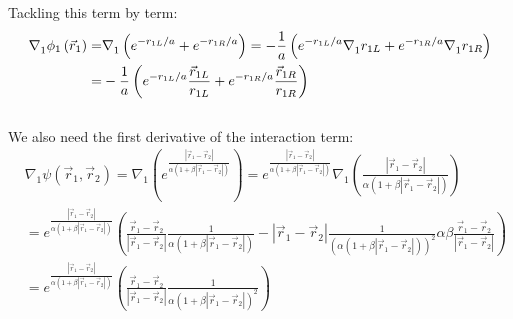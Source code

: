  Tackling this term by term: 
 \begin{align}
 \nabla _1^{}{\phi _1}\left( {{{\vec r}_1}} \right) =& \nabla _1^{}\left( {{e^{ - {{{r_{1L}}} \mathord{\left/
  {\vphantom {{{r_{1L}}} a}} \right.
  \kern-\nulldelimiterspace} a}}} + {e^{ - {{{r_{1R}}} \mathord{\left/
  {\vphantom {{{r_{1R}}} a}} \right.
  \kern-\nulldelimiterspace} a}}}} \right) =  - \frac{1}{a}\left( {{e^{ - {{{r_{1L}}} \mathord{\left/
  {\vphantom {{{r_{1L}}} a}} \right.
  \kern-\nulldelimiterspace} a}}}\nabla _1^{}{r_{1L}} + {e^{ - {{{r_{1R}}} \mathord{\left/
  {\vphantom {{{r_{1R}}} a}} \right.
  \kern-\nulldelimiterspace} a}}}\nabla _1^{}{r_{1R}}} \right)\nonumber\\ =&  - \frac{1}{a}\left( {{e^{ - {{{r_{1L}}} \mathord{\left/
  {\vphantom {{{r_{1L}}} a}} \right.
  \kern-\nulldelimiterspace} a}}}\frac{{{{\vec r}_{1L}}}}{{{r_{1L}}}} + {e^{ - {{{r_{1R}}} \mathord{\left/
  {\vphantom {{{r_{1R}}} a}} \right.
  \kern-\nulldelimiterspace} a}}}\frac{{{{\vec r}_{1R}}}}{{{r_{1R}}}}} \right)
 \end{align}\\
 We also need the first derivative of the interaction term:
 \begin{align}
 &\nabla _1^{}\psi \left( {{{\vec r}_1},{{\vec r}_2}} \right) = \nabla _1^{}\left( {{e^{\frac{{\left| {{{\vec r}_1} - {{\vec r}_2}} \right|}}{{\alpha \left( {1 + \beta \left| {{{\vec r}_1} - {{\vec r}_2}} \right|} \right)}}}}} \right) = {e^{\frac{{\left| {{{\vec r}_1} - {{\vec r}_2}} \right|}}{{\alpha \left( {1 + \beta \left| {{{\vec r}_1} - {{\vec r}_2}} \right|} \right)}}}}\nabla _1^{}\left( {\frac{{\left| {{{\vec r}_1} - {{\vec r}_2}} \right|}}{{\alpha \left( {1 + \beta \left| {{{\vec r}_1} - {{\vec r}_2}} \right|} \right)}}} \right)\nonumber\\
  &= {e^{\frac{{\left| {{{\vec r}_1} - {{\vec r}_2}} \right|}}{{\alpha \left( {1 + \beta \left| {{{\vec r}_1} - {{\vec r}_2}} \right|} \right)}}}}\left( {\frac{{{{\vec r}_1} - {{\vec r}_2}}}{{\left| {{{\vec r}_1} - {{\vec r}_2}} \right|}}\frac{1}{{\alpha \left( {1 + \beta \left| {{{\vec r}_1} - {{\vec r}_2}} \right|} \right)}} - \left| {{{\vec r}_1} - {{\vec r}_2}} \right|\frac{1}{{{{\left( {\alpha \left( {1 + \beta \left| {{{\vec r}_1} - {{\vec r}_2}} \right|} \right)} \right)}^2}}}\alpha \beta \frac{{{{\vec r}_1} - {{\vec r}_2}}}{{\left| {{{\vec r}_1} - {{\vec r}_2}} \right|}}} \right)\nonumber\\
 & = {e^{\frac{{\left| {{{\vec r}_1} - {{\vec r}_2}} \right|}}{{\alpha \left( {1 + \beta \left| {{{\vec r}_1} - {{\vec r}_2}} \right|} \right)}}}}\left( {\frac{{{{\vec r}_1} - {{\vec r}_2}}}{{\left| {{{\vec r}_1} - {{\vec r}_2}} \right|}}\frac{1}{{\alpha {{\left( {1 + \beta \left| {{{\vec r}_1} - {{\vec r}_2}} \right|} \right)}^2}}}} \right)
 \end{align}\\
